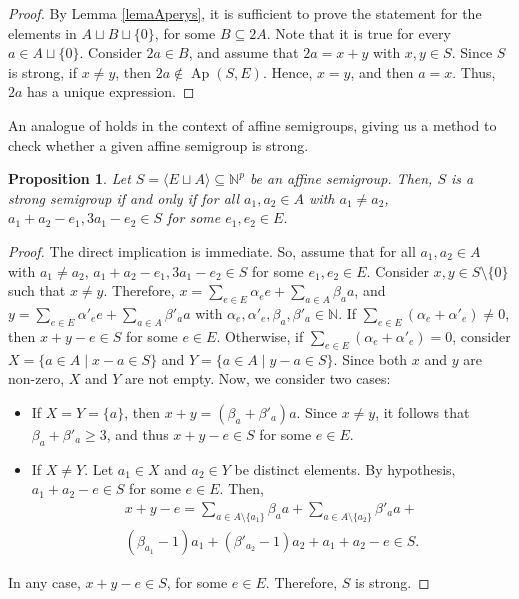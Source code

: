 \documentclass[a4paper,11pt]{article}
\newtheorem{proposition}[theorem]{Proposition}
\def\N{\mathbb{N}}
\def\Ap{\operatorname{Ap}}
\begin{document}
{\begin{proof}
By Lemma \ref{lemaAperys}, it is sufficient to prove the statement for the elements in $A \sqcup B\sqcup \{0\}$, for some $B\subseteq 2A$. Note that it is true for every $a\in A \sqcup \{0\}$. Consider $2a \in B$, and assume that $2a=x+y$ with $x,y\in S$. Since $S$ is strong, if $x\neq y$, then $2a\notin \Ap(S,E)$. Hence, $x=y$, and then $a=x$. Thus, $2a$ has a unique expression.
\end{proof}

An analogue of \cite[Proposition 5.1]{RoblesRosalesModularFrob} holds in the context of affine semigroups, giving us a method to check whether a given affine semigroup is strong.

\begin{proposition}\label{CheckStrongByGenerators}
Let $S=\langle E\sqcup A\rangle\subseteq \N^p$ be an affine semigroup. Then, $S$ is a strong semigroup if and only if for all $a_1,a_2\in A$ with $a_1\neq a_2$, $a_1+a_2-e_1,3a_1-e_2\in S$ for some $e_1,e_2\in E$.
\end{proposition}

\begin{proof}
The direct implication is immediate. So, assume that for all $a_1,a_2\in A$ with $a_1\neq a_2$, $a_1+a_2-e_1,3a_1-e_2\in S$ for some $e_1,e_2\in E$. Consider $x,y\in S\setminus \{0\}$ such that $x\neq y$. Therefore, $x=\sum_{e\in E}\alpha_e e + \sum _{a\in A} \beta_a a$, and $y=\sum_{e\in E}\alpha'_e e + \sum _{a\in A} \beta'_a a$ with $\alpha_e,\alpha'_e,\beta_a,\beta'_a\in \N$. If $\sum_{e\in E} (\alpha_e+\alpha'_e)\neq 0$, then $x+y-e\in S$ for some $e\in E$. Otherwise, if $\sum_{e\in E} (\alpha_e+\alpha'_e)=0$, consider $X=\{a\in A\mid x-a\in S\}$ and $Y=\{a\in A\mid y-a\in S\}$. Since both $x$ and $y$ are non-zero, $X$ and $Y$ are not empty. Now, we consider two cases:
\begin{itemize}
\item If $X=Y=\{a\}$, then $x+y=(\beta_a+\beta'_a)a$. Since $x\neq y$, it follows that $\beta_a+\beta'_a\ge 3$, and thus $x+y-e\in S$ for some $e\in E$.
\item If $X\neq Y$. Let $a_1\in X$ and $a_2\in Y$ be distinct elements. By hypothesis, $a_1+a_2- e\in S$ for some $e\in E$. Then,
\begin{multline*}
x+y-e= \sum _{a\in A\setminus\{a_1\}} \beta_a a + \sum _{a\in A\setminus\{a_2\}} \beta'_a a +\\
(\beta_{a_1}-1)a_1+(\beta'_{a_2}-1)a_2+a_1+a_2-e\in S.
\end{multline*}
\end{itemize}
In any case, $x+y-e\in S$, for some $e\in E$. Therefore, $S$ is strong.
\end{proof}


}
\end{document}
